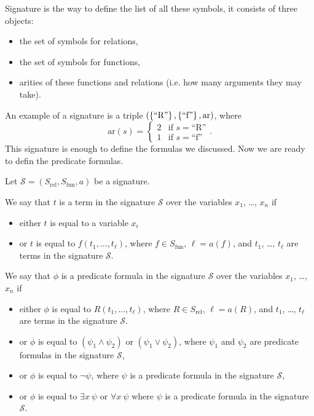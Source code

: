 Signature is the way to define the list of all these symbols, it consists of
three objects:
\begin{itemize}
  \item the set of symbols for relations,
  \item the set of symbols for functions,
  \item arities of these functions and relations (i.e. how many arguments they
    may take).
\end{itemize}
An example of a signature is a triple $(\set{\text{``R''}}, \set{\text{``f''}},
\mathrm{ar})$, where
\[
  \mathrm{ar}(s) = \begin{cases}
    2 & \text{if } s =  \text{``R''} \\
    1 & \text{if } s =  \text{``f''}
  \end{cases}.
\]
This signature is enough to define the formulas we discussed. Now we are ready
to defin the predicate formulas.

\begin{definition}
  Let $\mathcal{S} = (S_\mathrm{rel}, S_\mathrm{fun}, a)$ be a signature.

  We say that $t$ is a term in the signature $\mathcal{S}$ over the variables
  $x_1$, \dots, $x_n$ if
  \begin{itemize}
    \item either $t$ is equal to a variable $x_i$
    \item or $t$ is equal to $f(t_1, \dots, t_\ell)$, where
      $f \in S_\mathrm{fun}$, $\ell = a(f)$, and $t_1$, \dots, $t_\ell$
      are terms in the signature $\mathcal{S}$.
  \end{itemize}

  We say that $\phi$ is a predicate formula in the signature $\mathcal{S}$
  over the variables $x_1$, \dots, $x_n$  if
  \begin{itemize}
    \item either $\phi$ is equal to $R(t_1, \dots, t_\ell)$, where
      $R \in S_\mathrm{rel}$, $\ell = a(R)$, and $t_1$, \dots, $t_\ell$
      are terms in the signature $\mathcal{S}$.
    \item or $\phi$ is equal to $(\psi_1 \land \psi_2)$ or
      $(\psi_1 \lor \psi_2)$, where $\psi_1$ and $\psi_2$ are predicate
      formulas in the signature $\mathcal{S}$,
    \item or $\phi$ is equal to $\lnot \psi$, where $\psi$ is a predicate
      formula in the signature $\mathcal{S}$,
    \item or $\phi$ is equal to $\exists x~\psi$ or $\forall x~\psi$ where
      $\psi$ is a predicate formula in the signature $\mathcal{S}$.
  \end{itemize}
\end{definition}

